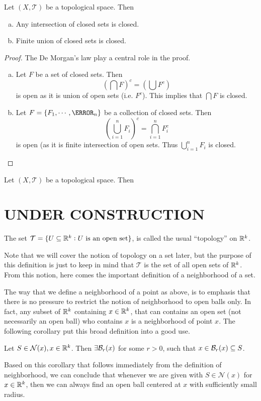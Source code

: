 \begin{propbox}
	Let $(X,\mathcal{T})$ be a topological space. Then 
	\begin{enumerate}[(a)]
		\item Any intersection of closed sets is closed.
		\item Finite union of closed sets is closed.
	\end{enumerate}
\end{propbox}
\begin{proof}
	The De Morgan's law play a central role in the proof.
	\begin{enumerate}[(a)]
		\item Let $F$ be a set of closed sets. Then 
		\[ (\bigcap F)^c = (\bigcup F^c) \]
		is open as it is union of open sets (i.e. $F^c$). This implies that $\bigcap F$ is closed. 
		\item Let $F = \{F_1, \cdots, \F_n\}$ be a collection of closed sets. Then 
		\[ (\bigcup_{i=1}^{n} F_i)^c = \bigcap_{i=1}^n F_i^c \]
		is open (as it is finite intersection of open sets. Thus $\bigcup_{i=1}^{n} F_i$ is closed.
	\end{enumerate}
\end{proof}

\begin{defbox}
	Let $(X,\mathcal{T})$ be a topological space. Then 
\end{defbox}

\section{UNDER CONSTRUCTION}
\begin{defbox}
	The set $\mathcal{T} = \{ U \subseteq \mathbb{R}^k: U \text{ is an open set} \}$, is called the usual ``topology'' on $\mathbb{R}^k$.
\end{defbox}
Note that we will cover the notion of topology on a set later, but the purpose of this definition is just to keep in mind that $\mathcal{T}$ is the set of all open sets of $\mathbb{R}^k$. From this notion, here comes the important definition of a neighborhood of a set.


The way that we define a neighborhood of a point as above, is to emphasis that there is no pressure to restrict the notion of neighborhood to open balls only. In fact, any subset of $\mathbb{R}^k$ containing $x\in\mathbb{R}^k$, that can contains an open set (not necessarily an open ball) who contains $x$ is a neighborhood of point $x$. The following corollary put this broad definition into a good use.
\begin{corbox}
	Let $S \in \mathcal{N}(x), x\in\mathbb{R}^k$. Then $\exists \mathcal{B}_{r}(x)$ for some $r>0$, such that $x\in\mathcal{B}_{r}(x)\subseteq S$.
\end{corbox}
Based on this corollary that follows immediately from the definition of neighborhood, we can conclude that whenever we are given with $S\in\mathcal{N}(x)$ for $x\in\mathbb{R}^k$, then we can always find an open ball centered at $x$ with sufficiently small radius. 

